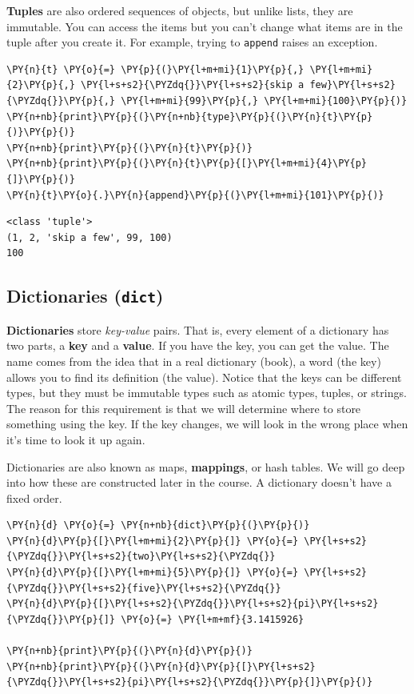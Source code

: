 \textbf{Tuples} are also ordered sequences of objects, but unlike lists, they are immutable.  You can access the items but you can’t change what items are in the tuple after you create it.  For example, trying to \texttt{append} raises an exception.


\begin{Verbatim}[commandchars=\\\{\}]
\PY{n}{t} \PY{o}{=} \PY{p}{(}\PY{l+m+mi}{1}\PY{p}{,} \PY{l+m+mi}{2}\PY{p}{,} \PY{l+s+s2}{\PYZdq{}}\PY{l+s+s2}{skip a few}\PY{l+s+s2}{\PYZdq{}}\PY{p}{,} \PY{l+m+mi}{99}\PY{p}{,} \PY{l+m+mi}{100}\PY{p}{)}
\PY{n+nb}{print}\PY{p}{(}\PY{n+nb}{type}\PY{p}{(}\PY{n}{t}\PY{p}{)}\PY{p}{)}
\PY{n+nb}{print}\PY{p}{(}\PY{n}{t}\PY{p}{)}
\PY{n+nb}{print}\PY{p}{(}\PY{n}{t}\PY{p}{[}\PY{l+m+mi}{4}\PY{p}{]}\PY{p}{)}
\PY{n}{t}\PY{o}{.}\PY{n}{append}\PY{p}{(}\PY{l+m+mi}{101}\PY{p}{)}
\end{Verbatim}

\begin{Verbatim}
<class 'tuple'>
(1, 2, 'skip a few', 99, 100)
100
\end{Verbatim}

\subsection{Dictionaries (\texttt{dict})}


\textbf{Dictionaries} store \emph{key-value} pairs.  That is, every element of a dictionary has two parts, a \textbf{key} and a \textbf{value}.  If you have the key, you can get the value.  The name comes from the idea that in a real dictionary (book), a word (the key) allows you to find its definition (the value).  Notice that the keys can be different types, but they must be immutable types such as atomic types, tuples, or strings.  The reason for this requirement is that we will determine where to store something using the key.  If the key changes, we will look in the wrong place when it's time to look it up again.


Dictionaries are also known as maps,  \textbf{mappings}, or hash tables.  We will go deep into how these are constructed later in the course.
A dictionary doesn't have a fixed order.


\begin{Verbatim}[commandchars=\\\{\}]
\PY{n}{d} \PY{o}{=} \PY{n+nb}{dict}\PY{p}{(}\PY{p}{)}
\PY{n}{d}\PY{p}{[}\PY{l+m+mi}{2}\PY{p}{]} \PY{o}{=} \PY{l+s+s2}{\PYZdq{}}\PY{l+s+s2}{two}\PY{l+s+s2}{\PYZdq{}}
\PY{n}{d}\PY{p}{[}\PY{l+m+mi}{5}\PY{p}{]} \PY{o}{=} \PY{l+s+s2}{\PYZdq{}}\PY{l+s+s2}{five}\PY{l+s+s2}{\PYZdq{}}
\PY{n}{d}\PY{p}{[}\PY{l+s+s2}{\PYZdq{}}\PY{l+s+s2}{pi}\PY{l+s+s2}{\PYZdq{}}\PY{p}{]} \PY{o}{=} \PY{l+m+mf}{3.1415926}

\PY{n+nb}{print}\PY{p}{(}\PY{n}{d}\PY{p}{)}
\PY{n+nb}{print}\PY{p}{(}\PY{n}{d}\PY{p}{[}\PY{l+s+s2}{\PYZdq{}}\PY{l+s+s2}{pi}\PY{l+s+s2}{\PYZdq{}}\PY{p}{]}\PY{p}{)}
\end{Verbatim}

